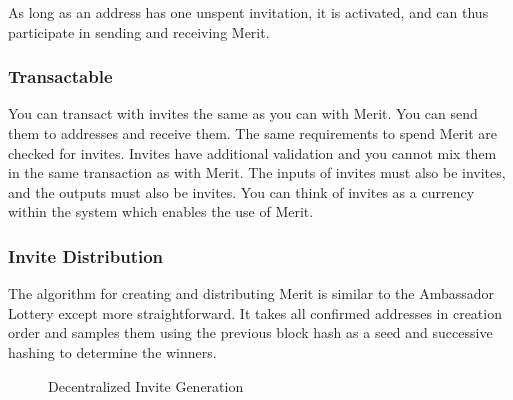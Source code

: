\documentclass{article}
\begin{document}
As long as an address has one unspent invitation, it is activated, and can thus participate in sending
and receiving Merit.

\subsubsection{Transactable}

You can transact with invites the same as you can with Merit.
You can send them to addresses and receive them. The same requirements to spend
Merit are checked for invites. Invites have additional validation and you cannot
mix them in the same transaction as with Merit. The inputs of invites must also
be invites, and the outputs must also be invites. You can think of invites as
a currency within the system which enables the use of Merit.

\subsubsection{Invite Distribution}

The algorithm for creating and distributing Merit is similar to the Ambassador
Lottery except more straightforward. It takes all confirmed addresses in creation
order and samples them using the previous block hash as a seed and successive
hashing to determine the winners.

\begin{figure}[H]
    \begin{center}
    \end{center}
    \caption{Decentralized Invite Generation}
\end{figure}
\end{document}
